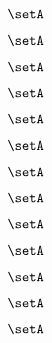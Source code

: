 \begin{forslides}
    \begin{equation}
        \label{eq:slides-translation-41}
        \setA
    \end{equation}

    \begin{equation}
        \label{eq:slides-translation-42}
        \setA
    \end{equation}

    \begin{equation}
        \label{eq:slides-translation-43}
        \setA
    \end{equation}

    \begin{equation}
        \label{eq:slides-translation-44}
        \setA
    \end{equation}

    \begin{equation}
        \label{eq:slides-translation-45}
        \setA
    \end{equation}

    \begin{equation}
        \label{eq:slides-translation-46}
        \setA
    \end{equation}

    \begin{equation}
        \label{eq:slides-translation-47}
        \setA
    \end{equation}

    \begin{equation}
        \label{eq:slides-translation-48}
        \setA
    \end{equation}

    \begin{equation}
        \label{eq:slides-translation-49}
        \setA
    \end{equation}
    
    \begin{equation}
        \label{eq:slides-translation-50}
        \setA
    \end{equation}

    \begin{equation}
        \label{eq:slides-translation-51}
        \setA
    \end{equation}

    \begin{equation}
        \label{eq:slides-translation-52}
        \setA
    \end{equation}

    \begin{equation}
        \label{eq:slides-translation-53}
        \setA
    \end{equation}


\end{forslides}
